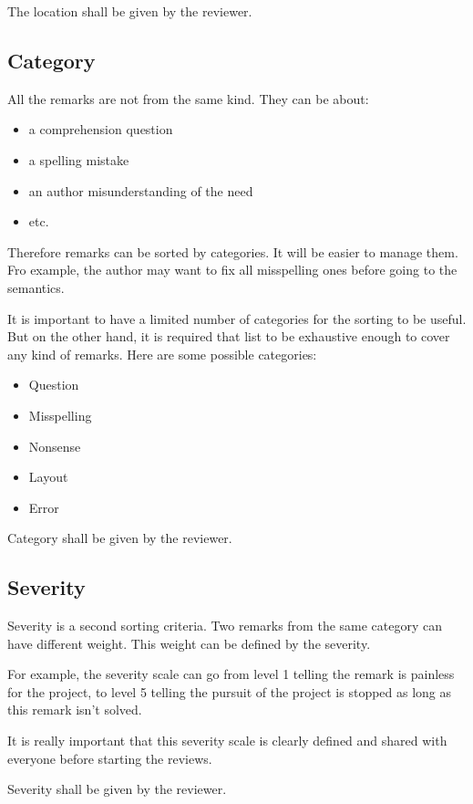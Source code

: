The location shall be given by the reviewer.

\subsection{Category}
All the remarks are not from the same kind. They can be about:

\begin{itemize}
    \item a comprehension question
    \item a spelling mistake
    \item an author misunderstanding of the need
    \item etc.
\end{itemize}

Therefore remarks can be sorted by categories. It will be easier to manage them. Fro example, the author may want to fix all misspelling ones before going to the semantics.

It is important to have a limited number of categories for the sorting to be useful. But on the other hand, it is required that list to be exhaustive enough to cover any kind of remarks. Here are some possible categories:

\begin{itemize}
    \item Question
    \item Misspelling
    \item Nonsense
    \item Layout
    \item Error
\end{itemize} 
Category shall be given by the reviewer.

\subsection{Severity}
Severity is a second sorting criteria. Two remarks from the same category can have different weight. This weight can be defined by the severity.

For example, the severity scale can go from level 1 telling the remark is painless for the project, to level 5 telling the pursuit of the project is stopped as long as this remark isn’t solved.

It is really important that this severity scale is clearly defined and shared with everyone before starting the reviews.

Severity shall be given by the reviewer.

